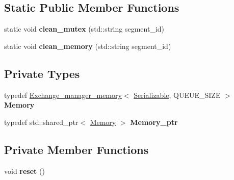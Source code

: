 \subsection*{Static Public Member Functions}
\begin{DoxyCompactItemize}
\item 
static void {\bfseries clean\+\_\+mutex} (std\+::string segment\+\_\+id)\hypertarget{classshared__memory_1_1Exchange__manager__consumer_a5aeebd5f2857f73c91fe3212d274909e}{}\label{classshared__memory_1_1Exchange__manager__consumer_a5aeebd5f2857f73c91fe3212d274909e}

\item 
static void {\bfseries clean\+\_\+memory} (std\+::string segment\+\_\+id)\hypertarget{classshared__memory_1_1Exchange__manager__consumer_a828a56d15a0f68edd8e3b395c41b0c0c}{}\label{classshared__memory_1_1Exchange__manager__consumer_a828a56d15a0f68edd8e3b395c41b0c0c}

\end{DoxyCompactItemize}
\subsection*{Private Types}
\begin{DoxyCompactItemize}
\item 
typedef \hyperlink{classshared__memory_1_1internal_1_1Exchange__manager__memory}{Exchange\+\_\+manager\+\_\+memory}$<$ \hyperlink{classSerializable}{Serializable}, Q\+U\+E\+U\+E\+\_\+\+S\+I\+ZE $>$ {\bfseries Memory}\hypertarget{classshared__memory_1_1Exchange__manager__consumer_a1699ba86d1d5b943d428fc1b391abd42}{}\label{classshared__memory_1_1Exchange__manager__consumer_a1699ba86d1d5b943d428fc1b391abd42}

\item 
typedef std\+::shared\+\_\+ptr$<$ \hyperlink{classshared__memory_1_1internal_1_1Exchange__manager__memory}{Memory} $>$ {\bfseries Memory\+\_\+ptr}\hypertarget{classshared__memory_1_1Exchange__manager__consumer_a92ad5c787b53c26d5b3c75712ca539f3}{}\label{classshared__memory_1_1Exchange__manager__consumer_a92ad5c787b53c26d5b3c75712ca539f3}

\end{DoxyCompactItemize}
\subsection*{Private Member Functions}
\begin{DoxyCompactItemize}
\item 
void {\bfseries reset} ()\hypertarget{classshared__memory_1_1Exchange__manager__consumer_a7543d28030c9c3e17b8fd60facc917b2}{}\label{classshared__memory_1_1Exchange__manager__consumer_a7543d28030c9c3e17b8fd60facc917b2}

\end{DoxyCompactItemize}
